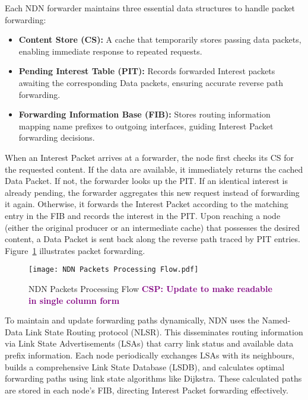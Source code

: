 \documentclass[conference]{IEEEtran}
\newcommand{\csp}[1]{\textbf{\textcolor{purple}{CSP: #1}}}
\begin{document}
Each NDN forwarder maintains three essential data structures to handle packet forwarding:

\begin{itemize}
    \item \textbf{Content Store (CS):} A cache that temporarily stores passing data packets, enabling immediate response to repeated requests.
    \item \textbf{Pending Interest Table (PIT):} Records forwarded Interest packets awaiting the corresponding Data packets, ensuring accurate reverse path forwarding.
    \item \textbf{Forwarding Information Base (FIB):} Stores routing information mapping name prefixes to outgoing interfaces, guiding Interest Packet forwarding decisions.
\end{itemize}

When an Interest Packet arrives at a forwarder, the node first checks its CS for the requested content. If the data are available, it immediately returns the cached Data Packet. If not, the forwarder looks up the PIT. If an identical interest is already pending, the forwarder aggregates this new request instead of forwarding it again. Otherwise, it forwards the Interest Packet according to the matching entry in the FIB and records the interest in the PIT. Upon reaching a node (either the original producer or an intermediate cache) that possesses the desired content, a Data Packet is sent back along the reverse path traced by PIT entries. Figure~\ref{fig:NDN Packets Processing Flow} illustrates packet forwarding.

\begin{figure}[t]
    \centering
    \texttt{[image: NDN Packets Processing Flow.pdf]}
    \caption{NDN Packets Processing Flow \csp{Update to make readable in single column form}}
    \label{fig:NDN Packets Processing Flow}
\end{figure}

To maintain and update forwarding paths dynamically, NDN uses the Named-Data Link State Routing protocol (NLSR). This disseminates routing information via Link State Advertisements (LSAs) that carry link status and available data prefix information. Each node periodically exchanges LSAs with its neighbours, builds a comprehensive Link State Database (LSDB), and calculates optimal forwarding paths using link state algorithms like Dijkstra. These calculated paths are stored in each node's FIB, directing Interest Packet forwarding effectively.
\end{document}
